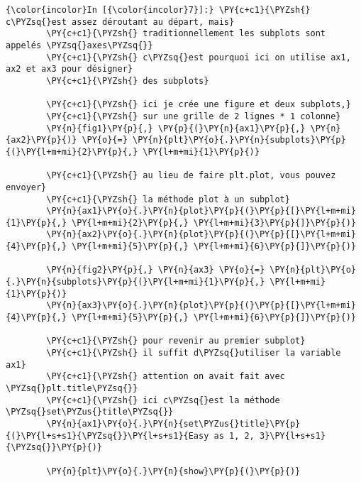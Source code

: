     \begin{Verbatim}[commandchars=\\\{\}]
{\color{incolor}In [{\color{incolor}7}]:} \PY{c+c1}{\PYZsh{} c\PYZsq{}est assez déroutant au départ, mais}
        \PY{c+c1}{\PYZsh{} traditionnellement les subplots sont appelés \PYZsq{}axes\PYZsq{}}
        \PY{c+c1}{\PYZsh{} c\PYZsq{}est pourquoi ici on utilise ax1, ax2 et ax3 pour désigner}
        \PY{c+c1}{\PYZsh{} des subplots}
        
        \PY{c+c1}{\PYZsh{} ici je crée une figure et deux subplots,}
        \PY{c+c1}{\PYZsh{} sur une grille de 2 lignes * 1 colonne}
        \PY{n}{fig1}\PY{p}{,} \PY{p}{(}\PY{n}{ax1}\PY{p}{,} \PY{n}{ax2}\PY{p}{)} \PY{o}{=} \PY{n}{plt}\PY{o}{.}\PY{n}{subplots}\PY{p}{(}\PY{l+m+mi}{2}\PY{p}{,} \PY{l+m+mi}{1}\PY{p}{)}
        
        \PY{c+c1}{\PYZsh{} au lieu de faire plt.plot, vous pouvez envoyer}
        \PY{c+c1}{\PYZsh{} la méthode plot à un subplot}
        \PY{n}{ax1}\PY{o}{.}\PY{n}{plot}\PY{p}{(}\PY{p}{[}\PY{l+m+mi}{1}\PY{p}{,} \PY{l+m+mi}{2}\PY{p}{,} \PY{l+m+mi}{3}\PY{p}{]}\PY{p}{)}
        \PY{n}{ax2}\PY{o}{.}\PY{n}{plot}\PY{p}{(}\PY{p}{[}\PY{l+m+mi}{4}\PY{p}{,} \PY{l+m+mi}{5}\PY{p}{,} \PY{l+m+mi}{6}\PY{p}{]}\PY{p}{)}
        
        \PY{n}{fig2}\PY{p}{,} \PY{n}{ax3} \PY{o}{=} \PY{n}{plt}\PY{o}{.}\PY{n}{subplots}\PY{p}{(}\PY{l+m+mi}{1}\PY{p}{,} \PY{l+m+mi}{1}\PY{p}{)}
        \PY{n}{ax3}\PY{o}{.}\PY{n}{plot}\PY{p}{(}\PY{p}{[}\PY{l+m+mi}{4}\PY{p}{,} \PY{l+m+mi}{5}\PY{p}{,} \PY{l+m+mi}{6}\PY{p}{]}\PY{p}{)}
        
        \PY{c+c1}{\PYZsh{} pour revenir au premier subplot}
        \PY{c+c1}{\PYZsh{} il suffit d\PYZsq{}utiliser la variable ax1}
        \PY{c+c1}{\PYZsh{} attention on avait fait avec \PYZsq{}plt.title\PYZsq{}}
        \PY{c+c1}{\PYZsh{} ici c\PYZsq{}est la méthode \PYZsq{}set\PYZus{}title\PYZsq{}}
        \PY{n}{ax1}\PY{o}{.}\PY{n}{set\PYZus{}title}\PY{p}{(}\PY{l+s+s1}{\PYZsq{}}\PY{l+s+s1}{Easy as 1, 2, 3}\PY{l+s+s1}{\PYZsq{}}\PY{p}{)}
        
        \PY{n}{plt}\PY{o}{.}\PY{n}{show}\PY{p}{(}\PY{p}{)}
\end{Verbatim}


    \begin{center}
    \end{center}
    { \hspace*{\fill} \\}
    
